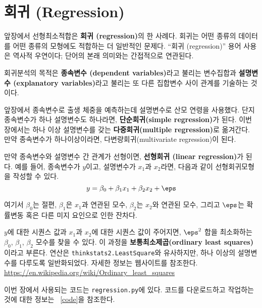 

\chapter{회귀 (Regression)}
\label{regression}

앞장에서 선형최소적합은 {\bf 회귀 (regression)}의 한 사례다. 회귀는 어떤 종류의 데이터를 어떤 종류의 모형에도 적합하는 더 일반적인 문제다. ``회귀 (regression)'' 용어 사용은 역사적 우연이다; 단어의 본래 의미와는 간접적으로 연관된다.

회귀분석의 목적은 {\bf 종속변수 (dependent variables)}라고 불리는 변수집합과 {\bf 설명변수 (explanatory variables)}라고 불리는 또 다른 집합변수 사이 관계를 기술하는 것이다.

앞장에서 종속변수로 출생 체중을 예측하는데 설명변수로 산모 연령을 사용했다.
단지 종속변수가 하나 설명변수도 하나라면, {\bf 단순회귀(simple regression)}가 된다. 이번 장에서는 하나 이상 설명변수를 갖는 {\bf 다중회귀(multiple regression)}로 옮겨간다. 만약 종속변수가 하나이상이라면, 다변량회귀(multivariate regression)이 된다.


만약 종속변수와 설명변수 간 관계가 선형이면, {\bf 선형회귀 (linear regression)}가 된다. 예를 들어, 종속변수가 $y$이고, 설명변수가 $x_1$과 $x_2$라면, 
다음과 같이 선형회귀모형을 작성할 수 있다.
%
\[ y = \beta_0 + \beta_1 x_1 + \beta_2 x_2 + \eps \]
%

여기서 $\beta_0$는 절편, $\beta_1$은 $x_1$과 연관된 모수, $\beta_2$는 
$x_2$와 연관된 모수, 그리고 $\eps$는 확률변동 혹은 다른 미지 요인으로 인한 잔차다.

$y$에 대한 시퀀스 값과 $x_1$과 $x_2$에 대한 시퀀스 값이 주어지면, $\eps^2$ 합을 최소화하는 $\beta_0$, $\beta_1$, $\beta_2$ 모수를 찾을 수 있다. 이 과정을 {\bf 보통최소제곱(ordinary least squares)}이라고 부른다. 
연산은 {\tt thinkstats2.LeastSquare}와 유사하지만, 하나 이상의 설명변수를 다루도록 일반화되었다. 자세한 정보는 웹사이트를 참조한다. \url{https://en.wikipedia.org/wiki/Ordinary_least_squares}

이번 장에서 사용되는 코드는 {\tt regression.py}에 있다.
코드를 다운로드하고 작업하는 것에 대한 정보는 ~\ref{code}을 참조한다.

